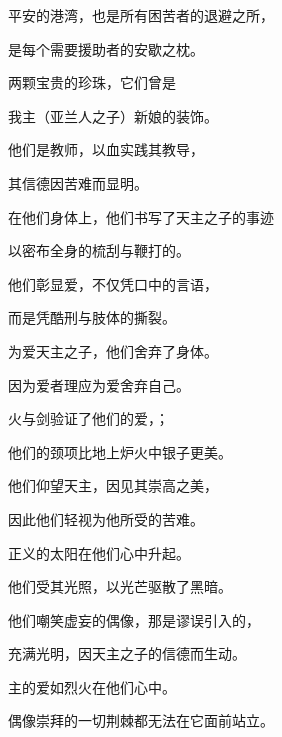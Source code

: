 平安的港湾，也是所有困苦者的退避之所，\par

是每个需要援助者的安歇之枕。\par

两颗宝贵的珍珠，它们曾是\par

我主（亚兰人之子）新娘的装饰。\par

他们是教师，以血实践其教导，\par

其信德因苦难而显明。\par

在他们身体上，他们书写了天主之子的事迹\par

以密布全身的梳刮与鞭打的。\par

他们彰显爱，不仅凭口中的言语，\par

而是凭酷刑与肢体的撕裂。\par

为爱天主之子，他们舍弃了身体。\par

因为爱者理应为爱舍弃自己。\par

火与剑验证了他们的爱，；\par

他们的颈项比地上炉火中银子更美。\par

他们仰望天主，因见其崇高之美，\par

因此他们轻视为他所受的苦难。\par

正义的太阳在他们心中升起。\par

他们受其光照，以光芒驱散了黑暗。\par

他们嘲笑虚妄的偶像，那是谬误引入的，\par

充满光明，因天主之子的信德而生动。\par

主的爱如烈火在他们心中。\par

偶像崇拜的一切荆棘都无法在它面前站立。\par

